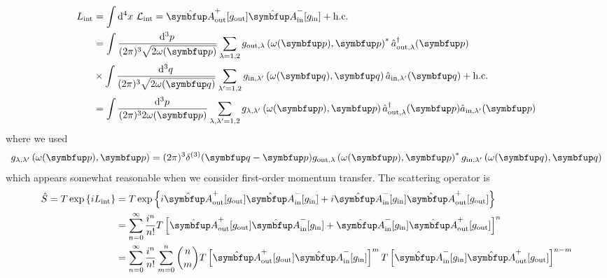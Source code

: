 \begin{equation*}
	\begin{split}
		L_\text{int}
		&=
		\int\dd[4]{x}
		\mathcal{L}_\text{int}
		=
		\hat{\vb{A}}_\text{out}^+[g_\text{out}]
		\hat{\vb{A}}_\text{in}^-[g_\text{in}]
		+
		\text{h.c.}
		\\
		&=
		\int\frac{\dd[3]{p}}{(2\pi)^3\sqrt{2\omega(\vb{p})}}
		\sum_{\lambda=1,2}
		g_{\text{out},\lambda}\left(\omega(\vb{p}),\vb{p}\right)^*
		\hat{a}_{\text{out},\lambda}^\dagger(\vb{p})
		\\
		&\times
		\int\frac{\dd[3]{q}}{(2\pi)^3\sqrt{2\omega(\vb{q})}}
		\sum_{\lambda^\prime=1,2}
		g_{\text{in},\lambda^\prime}\left(\omega(\vb{q}),\vb{q}\right)
		\hat{a}_{\text{in},\lambda^\prime}(\vb{q})
		+
		\text{h.c.}
		\\
		&=
		\int\frac{\dd[3]{p}}{(2\pi)^32\omega(\vb{p})}
		\sum_{\lambda,\lambda^\prime=1,2}
		g_{\lambda,\lambda^\prime}\left(\omega(\vb{p}),\vb{p}\right)
		\hat{a}_{\text{out},\lambda}^\dagger(\vb{p})
		\hat{a}_{\text{in},\lambda^\prime}(\vb{p})
	\end{split}
\end{equation*}
where we used
\begin{equation*}
	g_{\lambda,\lambda^\prime}\left(\omega(\vb{p}),\vb{p}\right)
	=
	(2\pi)^3\delta^{(3)}(\vb{q}-\vb{p})
	g_{\text{out},\lambda}\left(\omega(\vb{p}),\vb{p}\right)^*
	g_{\text{in},\lambda^\prime}\left(\omega(\vb{q}),\vb{q}\right)	
\end{equation*}
which appears somewhat reasonable when we consider first-order momentum transfer.
The scattering operator is
\begin{equation*}
	\begin{split}
		\hat{S}
		=
		T\exp\left\{
			iL_\text{int}
		\right\}
		&=
		T\exp\left\{
			i
			\hat{\vb{A}}_\text{out}^+[g_\text{out}]
			\hat{\vb{A}}_\text{in}^-[g_\text{in}]
			+
			i
			\hat{\vb{A}}_\text{in}^-[g_\text{in}]
			\hat{\vb{A}}_\text{out}^+[g_\text{out}]
		\right\}
		\\
		&=
		\sum_{n=0}^\infty
		\frac{i^n}{n!}
		T\left[
			\hat{\vb{A}}_\text{out}^+[g_\text{out}]
			\hat{\vb{A}}_\text{in}^-[g_\text{in}]
			+
			\hat{\vb{A}}_\text{in}^-[g_\text{in}]
			\hat{\vb{A}}_\text{out}^+[g_\text{out}]
		\right]^n
		\\
		&=
		\sum_{n=0}^\infty
		\frac{i^n}{n!}
		\sum_{m=0}^n
		\binom{n}{m}
		T\left[
			\hat{\vb{A}}_\text{out}^+[g_\text{out}]
			\hat{\vb{A}}_\text{in}^-[g_\text{in}]
		\right]^m
		T\left[
			\hat{\vb{A}}_\text{in}^-[g_\text{in}]
			\hat{\vb{A}}_\text{out}^+[g_\text{out}]
		\right]^{n-m}
	\end{split}
\end{equation*}
